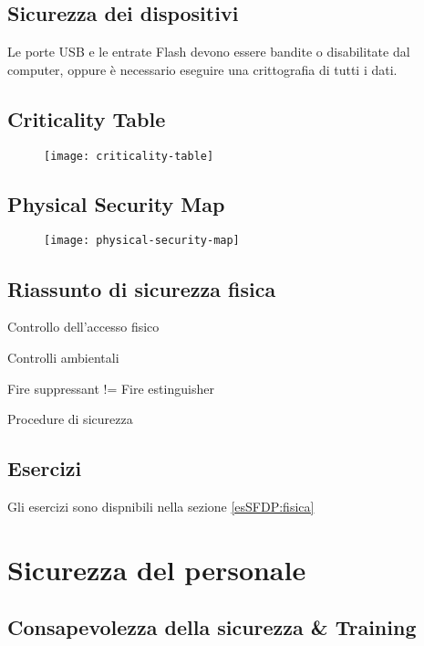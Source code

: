\subsection{Sicurezza dei dispositivi}

Le porte USB e le entrate Flash devono essere bandite o disabilitate dal 
computer, oppure è necessario eseguire una crittografia di tutti i dati.


\subsection{Criticality Table}

\begin{figure}[H]
 \centering
 \texttt{[image: criticality-table]}
\end{figure}

\subsection{Physical Security Map}
\begin{figure}[H]
 \centering
 \texttt{[image: physical-security-map]}
\end{figure}

\subsection{Riassunto di sicurezza fisica}

Controllo dell'accesso fisico

Controlli ambientali

Fire suppressant != Fire estinguisher

Procedure di sicurezza

\subsection{Esercizi}

Gli esercizi sono dispnibili nella sezione \ref{esSFDP:fisica}

\section{Sicurezza del personale}

\subsection{Consapevolezza della sicurezza \& Training}

